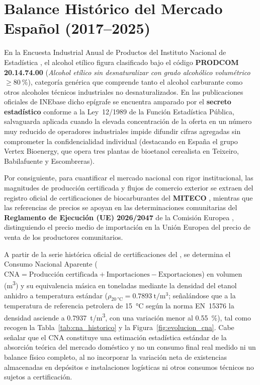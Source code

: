\documentclass{report}
\begin{document}
\section{Balance Histórico del Mercado Español (2017--2025)}
En la Encuesta Industrial Anual de Productos del Instituto Nacional de Estadística \autocite{INE2025}, el alcohol etílico figura clasificado bajo el código \textbf{PRODCOM 20.14.74.00} (\textit{Alcohol etílico sin desnaturalizar con grado alcohólico volumétrico $\ge \SI{80}{\percent}$}), categoría genérica que comprende tanto el alcohol carburante como otros alcoholes técnicos industriales no desnaturalizados. En las publicaciones oficiales de INEbase dicho epígrafe se encuentra amparado por el \textbf{secreto estadístico} conforme a la Ley~12/1989 de la Función Estadística Pública, salvaguarda aplicada cuando la elevada concentración de la oferta en un número muy reducido de operadores industriales impide difundir cifras agregadas sin comprometer la confidencialidad individual (destacando en España el grupo Vertex Bioenergy, que opera tres plantas de bioetanol cerealista en Teixeiro, Babilafuente y Escombreras).

\bigskip
Por consiguiente, para cuantificar el mercado nacional con rigor institucional, las magnitudes de producción certificada y flujos de comercio exterior se extraen del registro oficial de certificaciones de biocarburantes del \textbf{MITECO} \autocite{MITECO2026}, mientras que las referencias de precios se apoyan en las determinaciones comunitarias del \textbf{Reglamento de Ejecución (UE) 2026/2047} de la Comisión Europea \autocite[Considerandos~8 y~11]{DOUE2026}, distinguiendo el precio medio de importación en la Unión Europea del precio de venta de los productores comunitarios.

\bigskip
A partir de la serie histórica oficial de certificaciones del \textcite{MITECO2026}, se determina el Consumo Nacional Aparente ($\text{CNA} = \text{Producción certificada} + \text{Importaciones} - \text{Exportaciones}$) en volumen (\si{\cubic\meter}) y su equivalencia másica en toneladas mediante la densidad del etanol anhidro a temperatura estándar ($\rho_{\SI{20}{\celsius}} = \SI{0.7893}{\tonne/\cubic\meter}$; señalándose que a la temperatura de referencia petrolera de \SI{15}{\celsius} según la norma EN~15376 la densidad asciende a \SI{0.7937}{\tonne/\cubic\meter}, con una variación menor al \SI{0.55}{\percent}), tal como recogen la Tabla~\ref{tab:cna_historico} y la Figura~\ref{fig:evolucion_cna}. Cabe señalar que el CNA constituye una estimación estadística estándar de la absorción teórica del mercado doméstico y no un consumo final real medido ni un balance físico completo, al no incorporar la variación neta de existencias almacenadas en depósitos e instalaciones logísticas ni otros consumos técnicos no sujetos a certificación.
\end{document}
